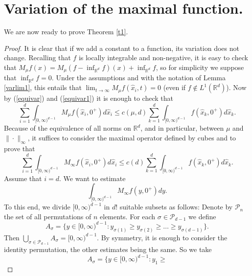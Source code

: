 \documentclass[12pt]{amsart}
\numberwithin{equation}{section}
\theoremstyle{plain}
\theoremstyle{definition}
\theoremstyle{remark}
\begin{document}
\section{Variation of the maximal function.}

We are now ready to prove Theorem \ref{t1}.

\begin{proof}
It is clear that if we add a constant to a
function, its variation does not change.
Recalling that $f$ is locally integrable and non-negative,
it is easy to check that
 $M_\mu f(x)=M_\mu
(f-\inf_{\mathbb{R}^d}f)(x)+ \inf_{\mathbb{R}^d}f$, so for simplicity we
suppose that
 $\inf_{\mathbb{R}^d}f=0$. Under the assumptions
 and with the notation of
 Lemma \ref{varlim1}, this entails
  that
 $\lim_{t\rightarrow \infty}
M_\mu f(\hat{x}_i,t)  =0$ (even if
$f\notin L^1 (\mathbb{R}^d)$).
Now by  (\ref{equivar}) and (\ref{equivar1}) it is enough to
check that
\begin{equation*}
  \sum_{i=1}^d\int_{[0, \infty)^{d-1}}
  M_\mu f(\hat{x}_i,0^+)d\hat{x}_i\le c(\mu,d)\sum_{k=1}^d
  \int_{[0, \infty)^{d-1}}
  f(\hat{x}_k,0^+)d\hat{x}_k.
\end{equation*}
Because of the equivalence of all norms on $\mathbb{R}^d$, and in particular,
between $\mu$ and $\|\cdot\|_\infty$, it suffices to
consider the maximal operator defined by cubes and to prove that
\begin{equation}\label{desigualdaddenormas}
  \sum_{i=1}^d\int_{[0, \infty)^{d-1}}
  M_\infty f(\hat{x}_i,0^+)d\hat{x}_i\le c(d)\sum_{k=1}^d
  \int_{[0, \infty)^{d-1}}
  f(\hat{x}_k,0^+)d\hat{x}_k.
\end{equation}
Assume that $i=d$. We want to estimate
\begin{equation*}
  \int_{[0, \infty)^{d-1}}
  M_\infty f(y,0^+)dy.
\end{equation*}
To this end, we divide $[0, \infty)^{d-1}$ in $d!$ suitable subsets
as follows: Denote by $\mathcal{P}_{n}$ the set of all permutations
of $n$ elements. For each
  $\sigma \in \mathcal{P}_{d-1}$ we define
\begin{equation*}
  A_\sigma= \{y\in [0, \infty)^{d-1} : y_{\sigma(1)}\ge
  y_{\sigma(2)}\ge \ldots \ge y_{\sigma(d-1)}\}.
\end{equation*}
Then $\bigcup_{\sigma \in \mathcal{P}_{d-1}}A_\sigma =
[0, \infty)^{d-1}$. By symmetry, it is enough to
consider  the
identity permutation, the other estimates being the same.
So we take
\begin{equation}\label{asigma}
  A_\sigma= \{y\in [0, \infty)^{d-1} : y_1\ge

\end{equation}
\end{proof}
\end{document}
